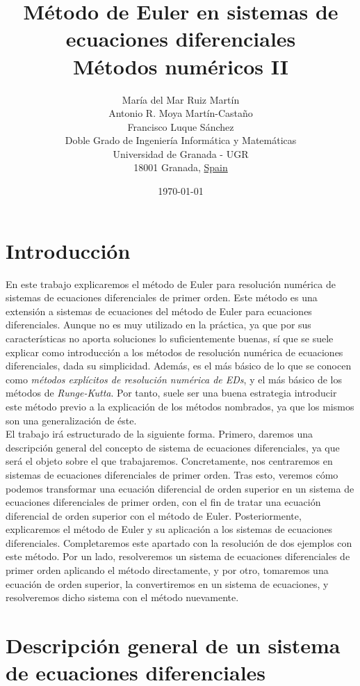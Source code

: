 \documentclass[12pt]{article}       %
\title{
    Método de Euler en sistemas de ecuaciones diferenciales \\              %
    \large Métodos numéricos II              %
}
\author{
        María del Mar Ruiz Martín \\
        Antonio R. Moya Martín-Castaño \\
        Francisco Luque Sánchez \\
        Doble Grado de Ingeniería Informática y Matemáticas\\
        Universidad de Granada - UGR\\
        18001 Granada, \underline{Spain}
}
\date{\today}
\begin{document}
\maketitle

\section{Introducción}

En este trabajo explicaremos el método de Euler para resolución numérica de sistemas de ecuaciones diferenciales de primer orden. Este método es una extensión a sistemas de ecuaciones del método de Euler para ecuaciones diferenciales. Aunque no es muy utilizado en la práctica, ya que por sus características no aporta soluciones lo suficientemente buenas, sí que se suele explicar como introducción a los métodos de resolución numérica de ecuaciones diferenciales, dada su simplicidad. Además, es el más básico de lo que se conocen como \textit{métodos explícitos de resolución numérica de EDs}, y el más básico de los métodos de \textit{Runge-Kutta}. Por tanto, suele ser una buena estrategia introducir este método previo a la explicación de los métodos nombrados, ya que los mismos son una generalización de éste.\\

El trabajo irá estructurado de la siguiente forma. Primero, daremos una descripción general del concepto de sistema de ecuaciones diferenciales, ya que será el objeto sobre el que trabajaremos. Concretamente, nos centraremos en sistemas de ecuaciones diferenciales de primer orden. Tras esto, veremos cómo podemos transformar una ecuación diferencial de orden superior en un sistema de ecuaciones diferenciales de primer orden, con el fin de tratar una ecuación diferencial de orden superior con el método de Euler. Posteriormente, explicaremos el método de Euler y su aplicación a los sistemas de ecuaciones diferenciales. Completaremos este apartado con la resolución de dos ejemplos con este método. Por un lado, resolveremos un sistema de ecuaciones diferenciales de primer orden aplicando el método directamente, y por otro, tomaremos una ecuación de orden superior, la convertiremos en un sistema de ecuaciones, y resolveremos dicho sistema con el método nuevamente.\\

\section{Descripción general de un sistema de ecuaciones diferenciales}
\end{document}
